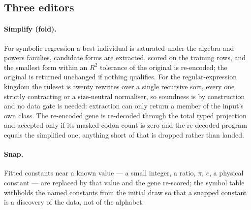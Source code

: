 \documentclass[sigconf,nonacm]{acmart}
\begin{document}
\subsection{Three editors}

\paragraph{Simplify (fold).} For symbolic regression a best individual is saturated under
the algebra and powers families, candidate forms are extracted, scored on the
training rows, and the smallest form within an $R^2$ tolerance of the original is
re-encoded; the original is returned unchanged if nothing qualifies. For the
regular-expression kingdom the ruleset is twenty rewrites over a single recursive
sort, every one strictly contracting or a size-neutral normaliser, so soundness
is by construction and no data gate is needed: extraction can only return a
member of the input's own class. The re-encoded gene is re-decoded through the
total typed projection and accepted only if its masked-codon count is zero and
the re-decoded program equals the simplified one; anything short of that is
dropped rather than landed.

\paragraph{Snap.} Fitted constants near a known value --- a small integer, a
ratio, $\pi$, $e$, a physical constant --- are replaced by that value and the
gene re-scored; the symbol table withholds the named constants from the initial
draw so that a snapped constant is a discovery of the data, not of the alphabet.
\end{document}
